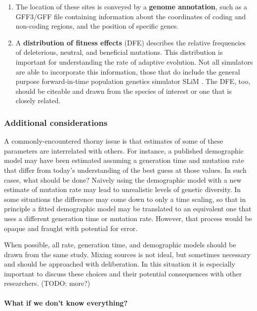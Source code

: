 \documentclass[hidelinks]{article}
\begin{document}
\begin{enumerate}
\def\labelenumi{\arabic{enumi}.}
\setcounter{enumi}{5}
\item
  The location of these sites is conveyed by a \textbf{genome
  annotation}, such as a GFF3/GFF file containing
  information about the coordinates of coding and non-coding regions,
  and the position of specific genes.
\item
  A \textbf{distribution of fitness effects} (DFE) describes the relative
  frequencies of deleterious, neutral, and beneficial mutations. This
  distribution is important for understanding the rate of adaptive
  evolution. Not all simulators are able to incorporate this
  information, those that do include the general purpose forward-in-time
  population genetics simulator SLiM \citep{Haller2019}. The DFE,
  too, should be citeable and drawn from the species of interest or one
  that is closely related.
\end{enumerate}

\hypertarget{additional-considerations}{%
\subsubsection*{Additional
considerations}\label{additional-considerations}}

A commonly-encountered thorny issue is that estimates of some of these
parameters are interrelated with others. For instance, a published
demographic model may have been estimated assuming a generation time and
mutation rate that differ from today's understanding of the best guess
at those values. In such cases, what should be done? Naively using the
demographic model with a new estimate of mutation rate may lead to
unrealistic levels of genetic diversity. In some situations the
difference may come down to only a time scaling, so that in principle a
fitted demographic model may be translated to an equivalent one that
uses a different generation time or mutation rate. However, that process
would be opaque and fraught with potential for error.

When possible, all rate, generation time, and demographic models should
be drawn from the same study. Mixing sources is not ideal, but sometimes
necessary and should be approached with deliberation. In this situation
it is especially important to discuss these choices and their potential
consequences with other researchers. (TODO: more?)

\hypertarget{what-if-we-dont-know-everything}{%
\paragraph{What if we don't know
everything?}\label{what-if-we-dont-know-everything}}
\end{document}

